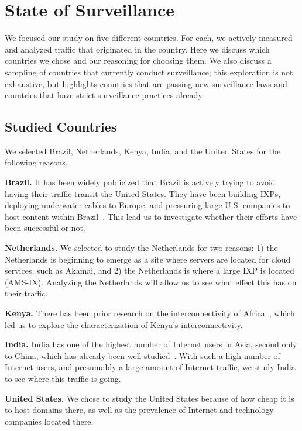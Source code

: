 \section{State of Surveillance}
\label{surv}
We focused our study on five different countries. For each, we actively measured and analyzed traffic that originated in the country.  Here we discuss which countries we chose and our reasoning for choosing them.  We also discuss a sampling of countries that currently conduct surveillance; this exploration is not exhaustive, but highlights countries that are passing new surveillance laws and countries that have strict surveillance practices already.   

\subsection{Studied Countries}
We selected Brazil, Netherlands, Kenya, India, and the United States for the following reasons.

{\bf Brazil.} It has been widely publicized that Brazil is actively trying to avoid having their traffic transit the United States.  They have been building IXPs, deploying underwater cables to Europe, and pressuring large U.S. companies to host content within Brazil~\cite{brazil_history, brazil_break_from_US, brazil_conference,
  brazil_conference2, brazil_human_rights, brazil_cable, brazil_us_companies, brazil_IXP1}.  This lead us to investigate whether their efforts have been successful or not.

{\bf Netherlands.}  We selected to study the Netherlands for two reasons: 1) the Netherlands is beginning to emerge as a site where servers are located for cloud services, such as Akamai, and 2) the Netherlands is where a large IXP is located (AMS-IX). Analyzing the Netherlands will allow us to see what effect this has on their traffic.

{\bf Kenya.} There has been prior research on the interconnectivity of Africa~\cite{gupta2014peering, fanou2015diversity}, which led us to explore the characterization of Kenya's interconnectivity.

{\bf India.}  India has one of the highest number of Internet users in Asia, second only to China, which has already been well-studied~\cite{tsui2003panopticon, wang2010discourse}.  With such a high number of Internet users, and presumably a large amount of Internet traffic, we study India to see where this traffic is going.

{\bf United States.}  We chose to study the United States because of how cheap it is to host domains there, as well as the prevalence of Internet and technology companies located there.

